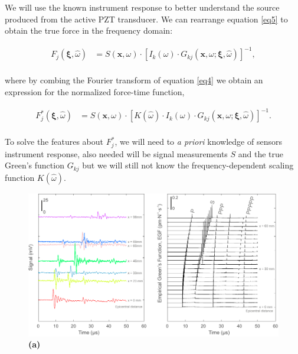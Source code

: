 \documentclass[preprint,3p, 11pt,authoryear]{elsarticle}
\begin{document}
We will use the known instrument response to better understand the source produced from the active PZT transducer.  We can rearrange equation \eqref{eq5} to obtain the true force in the frequency domain:

\begin{equation}
    \label{eq6}
\begin{split}
F_{j}\left( \mathbf{\xi}, \hat{\omega} \right) & = 
        S\left( \mathbf{x}, \omega \right) \cdot \left[ I_{k}\left(\omega \right) \cdot G_{kj}\left( \mathbf{x}, \omega; \mathbf{\xi}, \hat{\omega} \right)\right]^{-1}, \\
\end{split}
\end{equation}

\noindent where by combing the Fourier transform of equation \eqref{eq4} we obtain an expression for the normalized force-time function,

\begin{equation}
    \label{eq7}
\begin{split}
F^{*}_{j}\left( \mathbf{\xi}, \hat{\omega} \right) & = 
        S\left( \mathbf{x}, \omega \right) \cdot \left[ K\left(\hat{\omega}\right) \cdot I_{k}\left(\omega \right) \cdot G_{kj}\left( \mathbf{x}, \omega; \mathbf{\xi}, \hat{\omega} \right)\right]^{-1}.\\     
\end{split}
\end{equation}

\noindent To solve the features about $F^{*}_{j}$, we will need to \textit{a priori} knowledge of sensors instrument response, also needed will be signal measurements $S$ and the true Green's function $G_{kj}$ but we will still not know the frequency-dependent scaling function $K(\hat{\omega})$.




\begin{figure}[ht]
     	\centering
\includegraphics[scale= 1.0]{FIG3.pdf} 
\caption{\textbf{(a)}  }
	\label{fig3} 
\end{figure}
\end{document}
